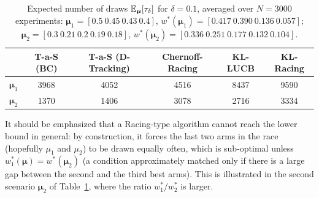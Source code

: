 \documentclass{colt2016} %
\begin{document}
\begin{table}[h]
\centering
\begin{tabular}{|c|c|c|c|c|c|}
\hline
 & T-a-S (BC) & T-a-S (D-Tracking) &  Chernoff-Racing & KL-LUCB & KL-Racing \\
\hline
$\bm\mu_1$ 
&  3968  & 4052   & 4516 & 8437 &  9590 \\\hline
$\bm \mu_2$
& 1370 & 1406 & 3078   & 2716 &  3334 \\
\hline
\end{tabular}
\caption{\label{tab:results} Expected number of draws $\mathbb{E}_{\bm\mu}[\tau_\delta]$ for $\delta=0.1$, averaged over $N=3000$ experiments:
$\bm\mu_1=[0.5 \ 0.45 \ 0.43 \ 0.4]$, $w^*(\bm \mu_1) =[0.417 \ 0.390 \ 0.136 \ 0.057]$;
$\bm\mu_2=[0.3 \ 0.21 \ 0.2 \ 0.19 \ 0.18]$, $w^*(\bm\mu_2)=[0.336 \ 0.251 \ 0.177  \ 0.132 \ 0.104]$.
}
\end{table}
It should be emphasized that a Racing-type algorithm cannot reach the lower bound in general: by construction, it forces the last two arms in the race (hopefully $\mu_1$ and $\mu_2$) to be drawn equally often, which is sub-optimal unless $w_1^*(\bm \mu) = w^*(\bm \mu_2)$ (a condition approximately matched only if there is a large gap between the second and the third best arms). This is illustrated in the second scenario $\bm\mu_2$ of Table~\ref{tab:results}, where the ratio $w_1^*/w_2^*$ is larger.
\end{document}
